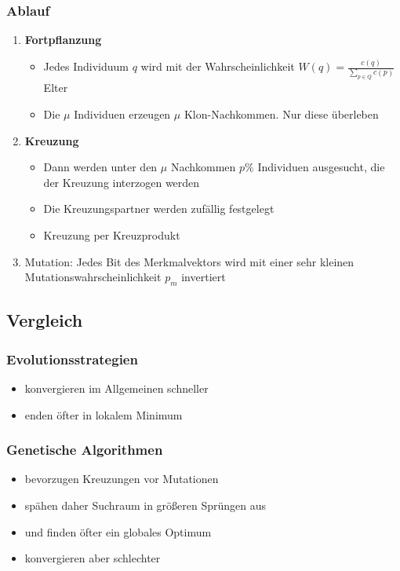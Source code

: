 \subsubsection{Ablauf}
\begin{enumerate}
	\item \textbf{Fortpflanzung}
	\begin{itemize}
		\item Jedes Individuum \(q\) wird mit der Wahrscheinlichkeit \(W(q) = \frac{c(q)}{\sum_{p \in Q}c(p)}\) Elter
		\item Die \(\mu\) Individuen erzeugen \(\mu\) Klon-Nachkommen. Nur diese überleben
	\end{itemize}
	\item \textbf{Kreuzung}
	\begin{itemize}
		\item Dann werden unter den \(\mu\) Nachkommen \(p\%\) Individuen ausgesucht, die der Kreuzung interzogen werden
		\item Die Kreuzungspartner werden zufällig festgelegt
		\item Kreuzung per Kreuzprodukt
	\end{itemize}
	\item Mutation: Jedes Bit des Merkmalvektors wird mit einer sehr kleinen Mutationswahrscheinlichkeit \(p_m\) invertiert
\end{enumerate}


\subsection{Vergleich}

\subsubsection{Evolutionsstrategien}
\begin{itemize}
	\item konvergieren im Allgemeinen schneller
	\item enden öfter in lokalem Minimum
\end{itemize}

\subsubsection{Genetische Algorithmen}
\begin{itemize}
	\item bevorzugen Kreuzungen vor Mutationen
	\item spähen daher Suchraum in größeren Sprüngen aus
	\item und finden öfter ein globales Optimum
	\item konvergieren aber schlechter
\end{itemize}


